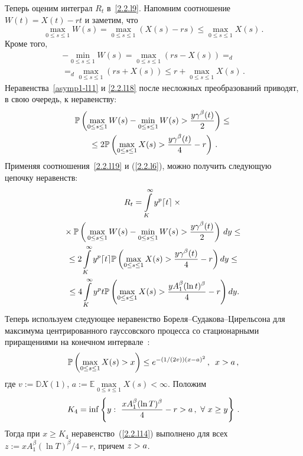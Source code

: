 \begin{multicols}{2}
Теперь оценим интеграл $R_t$ в~\eqref{2.2.l9}. Напомним соотношение
$W(t)=X(t)-rt$ и  заметим, что
\begin{equation}
\max\limits_{0 \leq s \leq 1}W(s)=\max\limits_{0 \leq s \leq 1}( X(s)-rs)
\leq \max\limits_{0 \leq s \leq 1} X(s)\,. \label{asymp1-l11}
\end{equation}
Кроме того,
\begin{multline}
-\min\limits_{0 \leq s \leq 1} W(s)=\max\limits_{0 \leq s \leq 1} (
rs-X(s))=_d{}\\
{}=_d\max\limits_{0 \leq s \leq 1} (rs+ X(s))
\leq r+ \max\limits_{0 \leq s \leq 1} X(s)\,.\label{2.2.l18}
\end{multline}
Неравенства~\eqref{asymp1-l11} и \eqref{2.2.l18} после несложных
преобразований приводят, в свою очередь, к неравенству:
\begin{multline}
\mathbb{P}\left(\max\limits_{0\leq s \leq 1}
W(s)-\min\limits_{0 \leq s \leq 1}W(s)>\displaystyle\frac{\displaystyle y \gamma^\beta(t)\mathstrut}{\displaystyle 2\mathstrut}\right) \leq {}\\
{}\leq
2 \mathbb{P}\left(\max\limits_{0\leq s \leq 1}X(s)>
\displaystyle\frac{\displaystyle y\gamma^\beta(t)\mathstrut}{\displaystyle 4\mathstrut}-r\right)\,. \label{2.2.l19}
\end{multline}
Применяя соотношения~\eqref{2.2.l19} и (\ref{2.2.l6}), можно получить
следующую цепочку неравенств:
\begin{multline}
R_t = \int\limits_{K}^\infty y^p \lceil t
\rceil\times{}\\
{}\times \Pu\left(\vphantom{\fr{\gamma^\beta}{2}}
\max_{0\leq s \leq 1}
W(s)-\min\limits_{0 \leq s \leq 1}W(s)>
\fr{y \gamma^\beta(t)}{2}\right)\,dy \leq{} \\
{}\leq 2 \int\limits_{K}^\infty y^p \lceil
t \rceil\Pu\left(\max\limits_{0\leq s \leq 1}X(s)>\fr{y\gamma^\beta(t)}{4}-r\right)dy \leq{} \\
\!\!{}\leq 4 \int\limits_{K}^\infty y^p  t
\Pu\left(\max\limits_{0\leq s \leq 1}X(s)>
\fr{y A_1^\beta(\ln t)^\beta}{4}-r\right)dy.\!\! \label{2.2.l11}
\end{multline}
Теперь   используем  следующее неравенство
Бо\-ре\-ля--Су\-да\-ко\-ва--Ци\-рель\-со\-на для максимума центрированного
гауссовского процесса со стационарными приращениями на конечном
интервале~\cite{Adler, Lifshits}:
\begin{equation}
\mathbb{P} \left( \max\limits_{0 \leq s \leq 1} X(s)> x \right) \leq
e^{-({1}/{(2v)})(x-a)^2}\,, \enskip x>a\,,
\label{2.2.l14}
\end{equation}
где $v:=\mathbb{D} X(1)$, $a:=\mathbb{E} \max\limits_{0 \leq s \leq 1} X(s)<\infty$.
Положим
$$
K_4=\inf\left\{y:\,\,\displaystyle\frac{\displaystyle x A_1^\beta(\ln T)^\beta\mathstrut}{\displaystyle 4\mathstrut}-r>a\,,\ \forall\  x \geq y\right\}\,.
$$
Тогда при  $x\ge K_4$ неравенство~(\ref{2.2.l14}) выполнено для всех
$z:={x A_1^\beta(\ln T)^\beta}/{4}-r$,   причем
$ z\hm>a$.


\end{multicols}
